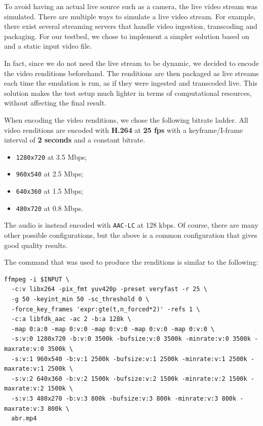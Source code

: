 To avoid having an actual live source such as a camera, the live video stream was simulated. There are multiple ways to simulate a live video stream. For example, there exist several streaming servers that handle video ingestion, transcoding and packaging. For our testbed, we chose to implement a simpler solution based on \ffmpeg{} and a static input video file.

In fact, since we do not need the live stream to be dynamic, we decided to encode the video renditions beforehand. The renditions are then packaged as live streams each time the emulation is run, as if they were ingested and transcoded live. This solution makes the test setup much lighter in terms of computational resources, without affecting the final result.

When encoding the video renditions, we chose the following bitrate ladder. All video renditions are encoded with \textbf{H.264} at \textbf{25 fps} with a keyframe/I-frame interval of \textbf{2 seconds} and a constant bitrate.

\begin{itemize}
    \item \texttt{1280x720} at 3.5 Mbps;
    \item \texttt{960x540} at 2.5 Mbps;
    \item \texttt{640x360} at 1.5 Mbps;
    \item \texttt{480x720} at 0.8 Mbps.
\end{itemize}

The audio is instead encoded with \texttt{AAC-LC} at 128 kbps. Of course, there are many other possible configurations, but the above is a common configuration that gives good quality results.\cite{ozer}

The \ffmpeg{} command that was used to produce the renditions is similar to the following:

\begin{verbatim}
ffmpeg -i $INPUT \
  -c:v libx264 -pix_fmt yuv420p -preset veryfast -r 25 \
  -g 50 -keyint_min 50 -sc_threshold 0 \
  -force_key_frames 'expr:gte(t,n_forced*2)' -refs 1 \
  -c:a libfdk_aac -ac 2 -b:a 128k \
  -map 0:a:0 -map 0:v:0 -map 0:v:0 -map 0:v:0 -map 0:v:0 \
  -s:v:0 1280x720 -b:v:0 3500k -bufsize:v:0 3500k -minrate:v:0 3500k -maxrate:v:0 3500k \
  -s:v:1 960x540 -b:v:1 2500k -bufsize:v:1 2500k -minrate:v:1 2500k -maxrate:v:1 2500k \
  -s:v:2 640x360 -b:v:2 1500k -bufsize:v:2 1500k -minrate:v:2 1500k -maxrate:v:2 1500k \
  -s:v:3 480x270 -b:v:3 800k -bufsize:v:3 800k -minrate:v:3 800k -maxrate:v:3 800k \
  abr.mp4
\end{verbatim}


